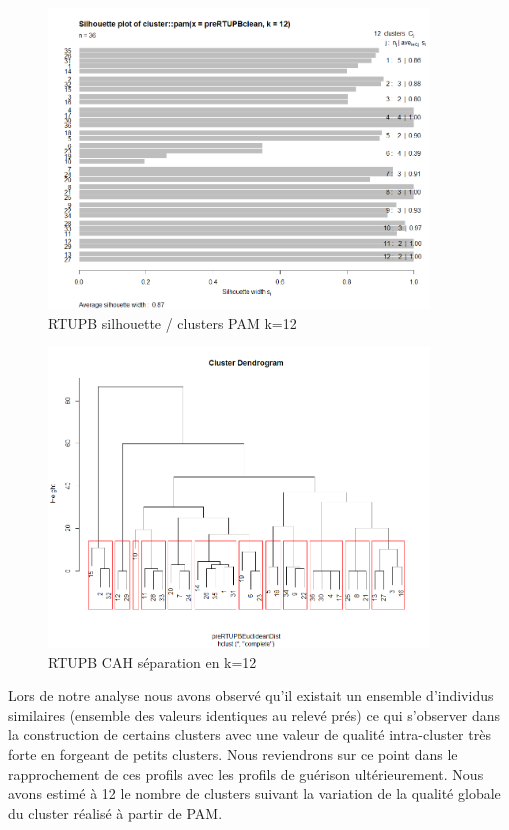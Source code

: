 \begin{figure}[H]
\centering
\includegraphics[width=0.90\textwidth]{../Fig/RTUPB/rtupb-sil-k12-pre.png}
\caption{RTUPB silhouette / clusters PAM k=12 }
\end{figure}

\begin{figure}[H]
\centering
\includegraphics[width=0.90\textwidth]{../Fig/RTUPB/rtupb-cah-k12-pre.png}
\caption{RTUPB CAH séparation en k=12 }
\end{figure}


%
%

Lors de notre analyse nous avons observé qu'il existait un ensemble d'individus similaires (ensemble des valeurs
identiques au relevé prés) ce qui s'observer dans la construction de certains clusters avec une valeur de qualité 
intra-cluster très forte en forgeant de petits clusters. Nous reviendrons sur ce point dans le rapprochement de ces
profils avec les profils de guérison ultérieurement. Nous avons estimé à 12 le nombre de clusters suivant la variation 
de la qualité globale  du cluster réalisé à partir de PAM. 



